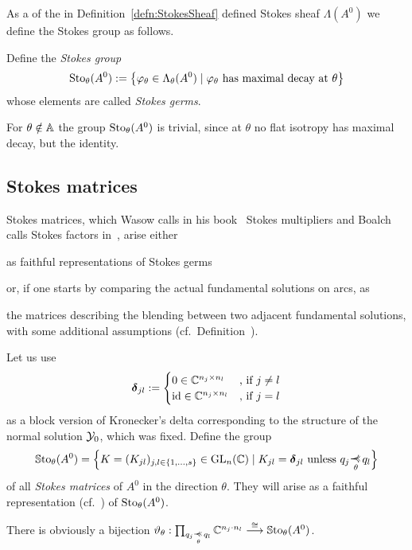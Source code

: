 As a  of the in
Definition~\ref{defn:StokesSheaf} defined Stokes sheaf $\Lambda(A^0)$ we
define the Stokes group as follows.
\begin{defn}\label{defn:stokesGroup}
  Define the \emph{Stokes group}
  \[
    \operatorname{Sto}_\theta(A^0):=
    \left\{\varphi_\theta\in\Lambda_\theta(A^0)
      \mid \varphi_\theta \text{~has maximal decay at~} \theta
    \right\}
  \]
  whose elements are called \emph{Stokes germs}.
  \begin{s-rem}
    For $\theta\notin\mathbb{A}$ the group $\operatorname{Sto}_\theta(A^0)$ is trivial, since at
    $\theta$ no flat isotropy has maximal decay, but the identity.
  \end{s-rem}
\end{defn}

\subsection{Stokes matrices}\label{sec:matrixReps}
Stokes matrices, which Wasow calls in his book~\cite{wasow2002asymptotic}
Stokes multipliers and Boalch calls Stokes factors in~\cite{boalch,thboalch},
arise either
\begin{einr}
  as faithful representations of Stokes germs
\end{einr}
or, if one starts by comparing the actual fundamental solutions on arcs, as
\begin{einr}
  the matrices describing the blending between two adjacent fundamental
  solutions, with some additional assumptions
  (cf.\ Definition~\cite[80]{Loday2014}).
\end{einr}
\begin{defn}\label{defn:groupOfFaithfullReps}
  Let us use
  \[
    \boldsymbol{\delta}_{jl}:=
    \begin{cases}
      0 \in \mathbb{C}^{n_j\times n_l} & \text{,~if~} j\neq l
    \\\operatorname{id} \in \mathbb{C}^{n_j\times n_l} & \text{,~if~} j=l
    \end{cases}
  \]
  as a block version of Kronecker's delta corresponding to the structure of the
  normal solution $\mathcal{Y}_0$, which was fixed.
  Define the group
  \begin{align*}
    \SSto_\theta(A^0)= \Big\{K=(K_{jl})_{j,l\in\{1,\dots,s\}}\in\GL_n(\C) \mid
      K_{jl}=\bdelta_{jl} \text{~unless~} q_j\myrel{\theta}q_l \Big\}
  \end{align*}
  of all \emph{Stokes matrices} of $A^0$ in the direction $\theta$.
  They will arise as a faithful representation
  (cf.~\cite[Def.4.1]{hall2003lie}) of $\operatorname{Sto}_\theta(A^0)$.
  \begin{s-rem}\label{rem:groupOfFaithfullReps}
    There is obviously a bijection
    $\vartheta_\theta: \prod_{q_j\myrel{\theta}q_l}\C^{n_j \cdot n_l}
    \overset{\cong}{\longrightarrow} \SSto_\theta(A^0)$.
  \end{s-rem}
\end{defn}

